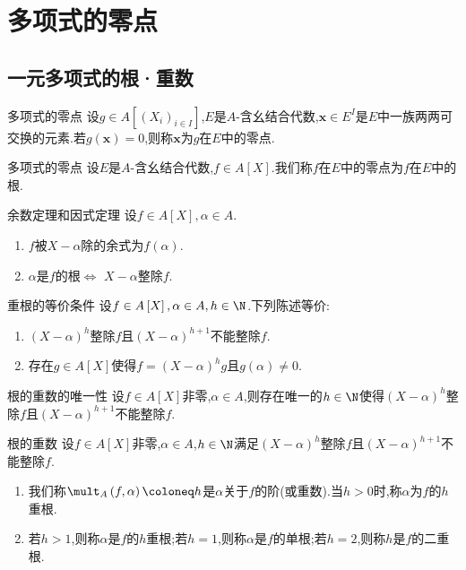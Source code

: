 \chapter{多项式的零点}

\section{一元多项式的根·重数}

\begin{definition}{多项式的零点}{}
	设$g\in A\left[\left(X_{i}\right)_{i\in I}\right]$,$E$是$A$-含幺结合代数,$\mathbf{x}\in E^{I}$是$E$中一族两两可交换的元素.若$g\left(\mathbf{x}\right)=0$,则称$\mathbf{x}$为$g$在$E$中的零点.
\end{definition}

\begin{definition}{多项式的零点}{}
	设$E$是$A$-含幺结合代数,$f\in A\left[X\right]$.我们称$f$在$E$中的零点为$f$在$E$中的根.
\end{definition}

\begin{proposition}{余数定理和因式定理}{}
	设$f\in A\left[X\right],\alpha\in A$.
	\begin{enumerate}
		\item $f$被$X-\alpha$除的余式为$f\left(\alpha\right)$.
		\item $\alpha$是$f$的根$\iff$ $X-\alpha$整除$f$.
	\end{enumerate}
\end{proposition}

\begin{proposition}{重根的等价条件}{}
	设$f\in A\left[X\right],\alpha\in A,h\in\N$.下列陈述等价:
	\begin{enumerate}
		\item $\left(X-\alpha\right)^{h}$整除$f$且$\left(X-\alpha\right)^{h+1}$不能整除$f$.
		\item 存在$g\in A\left[X\right]$使得$f=\left(X-\alpha\right)^{h}g$且$g\left(\alpha\right)\neq 0$.
	\end{enumerate}
\end{proposition}

\begin{proposition}{根的重数的唯一性}{}
	设$f\in A\left[X\right]$非零,$\alpha\in A$,则存在唯一的$h\in\N$使得$\left(X-\alpha\right)^{h}$整除$f$且$\left(X-\alpha\right)^{h+1}$不能整除$f$.
\end{proposition}

\begin{definition}{根的重数}{}
	设$f\in A\left[X\right]$非零,$\alpha\in A$,$h\in\N$满足$\left(X-\alpha\right)^{h}$整除$f$且$\left(X-\alpha\right)^{h+1}$不能整除$f$.
	\begin{enumerate}
		\item 我们称$\mult_{A}\left(f,\alpha\right)\coloneq h$是$\alpha$关于$f$的阶(或重数).当$h>0$时,称$\alpha$为$f$的$h$重根.
		\item 若$h>1$,则称$\alpha$是$f$的$h$重根;若$h=1$,则称$\alpha$是$f$的单根;若$h=2$,则称$h$是$f$的二重根.
	\end{enumerate}
\end{definition}

